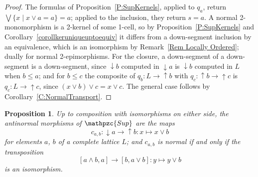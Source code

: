 \documentclass[reqno,a4paper]{amsart}
\numberwithin{equation}{section}
\theoremstyle{plain}
\newtheorem{proposition}[subsection]{Proposition}
\theoremstyle{definition}
\def\nameit#1{\textrm{#1}~}
\def\prox{\nameit{Proposition}}
\def\corx{\nameit{Corollary}}
\def\remx{\nameit{Remark}}
\newcommand{\catfont}[1]{\ensuremath{\mathpzc{#1}}\xspace}
\newcommand{\Sup}{\catfont{Sup}}
\renewcommand{\1}{\onecat{1}}
\newcommand{\dseg}[1]{\ensuremath{{\downarrow}#1}}
\newcommand{\useg}[1]{\ensuremath{{\uparrow}#1}}
\newcommand{\too}{\longrightarrow}
\begin{document}
\begin{proof}
	The formulas of \prox\ref{P:SupKernels}, applied to \(q_{a}\), return \(\bigvee\{x\mid x\vee a=a\}=a\); applied to the inclusion, they return \(s=a\). A normal 2-monomorphism is a 2-kernel of some 1-cell, so by \prox\ref{P:SupKernels} and \corx\ref{corollkeruniqueuptoequiv} it differs from a down-segment inclusion by an equivalence, which is an isomorphism by \remx\ref{Rem Locally Ordered}; dually for normal 2-epimorphisms. For the closure, a down-segment of a down-segment is a down-segment, since \(\dseg{b}\) computed in \(\dseg{a}\) is \(\dseg{b}\) computed in \(L\) when \(b\leq a\); and for \(b\leq c\) the composite of \(q_{b}\colon L\to\useg{b}\) with \(q_{c}\colon\useg{b}\to\useg{c}\) is \(q_{c}\colon L\to\useg{c}\), since \((x\vee b)\vee c=x\vee c\). The general case follows by \corx\ref{C:NormalTransport}.
\end{proof}

\begin{proposition}\label{P:SupAntinormal}
	Up to composition with isomorphisms on either side, the antinormal morphisms of \(\Sup\) are the maps
	\[
		c_{a,b}\colon\dseg{a}\too\useg{b}\colon x\mapsto x\vee b
	\]
	for elements \(a\), \(b\) of a complete lattice \(L\); and \(c_{a,b}\) is normal if and only if the transposition
	\[
		[a\wedge b,a]\too[b,a\vee b]\colon y\mapsto y\vee b
	\]
	is an isomorphism.
\end{proposition}
\end{document}
